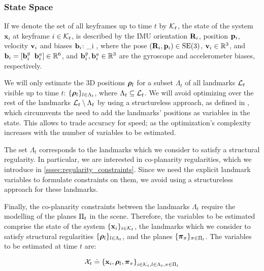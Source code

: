 \subsubsection{State Space}
\label{sssec:state_space}

If we denote the set of all keyframes up to time $t$ by $\calK_t$, the state of the system $\mathbf{x}_i$ at keyframe $i\in\calK_t$, is described by the IMU orientation $\mathbf{R}_i$,
 position $\mathbf{p}_i$, velocity $\mathbf{v}_i$ and biases $\mathbf{b}_i$:
\beq
{}_i ,
\eeq
where the pose $(\mathbf{R}_i, \mathbf{p}_i) \in \mathrm{SE}(3)$, $\mathbf{v}_i \in \mathbb{R}^3$, and $\mathbf{b}_i = [\mathbf{b}^g_i \;\; \mathbf{b}^a_i] \in \mathbb{R}^6$, and $\mathbf{b}^g_i, \mathbf{b}^a_i \in \mathbb{R}^3$ are the gyroscope and accelerometer biases, respectively.

We will only estimate the 3D positions $\bm{\rho}_l$ for a subset $\Lambda_t$ of all landmarks $\LandmarkSet_t$ visible up to time $t$: $\{\bm{\rho}_l\}_{l\in\Lambda_t}$, where $\Lambda_t \subseteq \LandmarkSet_t$.
We will avoid optimizing over the rest of the landmarks $\LandmarkSet_t\setminus\Lambda_t$ by using a structureless approach, as defined in \cite[Sec. VII]{Forster17troOnmanifold}, which circumvents the need to add the landmarks' positions as variables in the state.
This allows to trade accuracy for speed; as the optimization’s complexity increases with the number of variables to be estimated.

The set $\Lambda_t$ corresponds to the landmarks which we consider to satisfy a structural regularity.
In particular, we are interested in co-planarity regularities, which we introduce in \cref{sssec:regularity_constraints}.
Since we need the explicit landmark variables to formulate constraints on them, we avoid using a structureless approach for these landmarks.

Finally, the co-planarity constraints between the landmarks $\Lambda_t$ require the modelling of the planes $\Pi_t$ in the scene.
Therefore, the variables to be estimated comprise the state of the system $\{\mathbf{x}_i\}_{i\in\calK_t}$, the landmarks which we consider to satisfy structural regularities $\{\bm{\rho}_l\}_{l\in\Lambda_t}$, and the planes $\{\boldsymbol{\pi}_\pi\}_{\pi\in\Pi_t}$.
The variables to be estimated at time $t$ are:

\begin{equation}
  \calX_t \doteq \displaystyle\left\{\mathbf{x}_i, \landmark_l, \Plane_\pi\right\}_{i\in\calK_t, l\in\Lambda_t, \pi\in\Pi_t}
  \label{eq:state_vector}
\end{equation}

